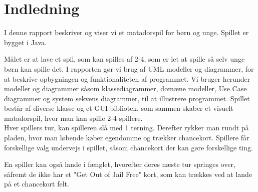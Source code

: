 \section{Indledning}
I denne rapport beskriver og viser vi et matadorspil for børn og unge. Spillet er bygget i Java. 

Målet er at lave et spil, som kan spilles af 2-4, som er let at spille så selv unge børn kan spille det. I rapporten gør vi brug af UML modeller og diagrammer, for at beskrive opbygningen og funktionaliteten af programmet. Vi bruger herunder modeller og diagrammer såsom klassediagrammer, domæne modeller, Use Case diagrammer og system sekvens diagrammer, til at illustrere programmet. 
\medskip
Spillet består af diverse klasse og et GUI bibliotek, som sammen skaber et visuelt matadorspil, hvor man kan spille 2-4 spillere. \\ Hver spillers tur, kan spilleren slå med 1 terning. Derefter rykker man rundt på pladen, hvor man løbende køber egendomme og trækker chancekort. Spillere får forskellige valg undervejs i spillet, såsom chancekort der kan gøre forskellige ting. 

En spiller kan også lande i fænglet, hvorefter deres næste tur springes over, såfremt de ikke har et "Get Out of Jail Free" kort, som kan trækkes ved at lande på et chancekort felt. 
